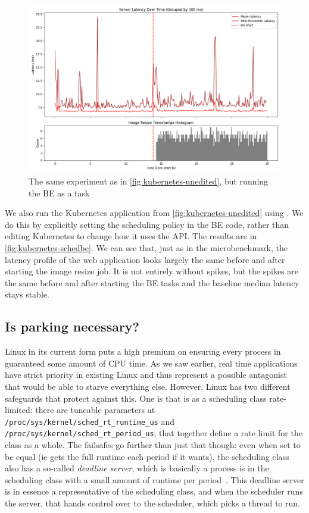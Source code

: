 \begin{figure}[t]
    \centering
    \includegraphics[width=\columnwidth]{graphs/kubernetes-schedbe.png}
    \caption{The same experiment as in \autoref{fig:kubernetes-unedited}, but
    running the BE as a \schedbe{} task}\label{fig:kubernetes-schedbe}
\end{figure}

We also run the Kubernetes application from \autoref{fig:kubernetes-unedited}
using \schedbe{}. We do this by explicitly setting the scheduling policy in the
BE code, rather than editing Kubernetes to change how it uses the \cgroups{}
API. The results are in \autoref{fig:kubernetes-schedbe}. We can see that, just
as in the microbenchmark, the latency profile of the web application looks
largely the same before and after starting the image resize job. It is not
entirely without spikes, but the spikes are the same before and after starting
the BE tasks and the baseline median latency stays stable. 

\subsection{Is parking necessary?}\label{ss:eval:parking}

Linux in its current form puts a high premium on ensuring every process in
guaranteed some amount of CPU time. As we saw earlier, real time applications
have strict priority in existing Linux and thus represent a possible antagonist
that would be able to starve everything else. However, Linux has two different
safeguards that protect against this. One is that \fifoclass{} is as a
scheduling class rate-limited: there are tuneable parameters at
\texttt{/proc/sys/kernel/sched\_rt\_runtime\_us} and
\texttt{/proc/sys/kernel/sched\_rt\_period\_us}, that together define a rate
limit for the \fifoclass{} class as a whole. The failsafes go further than just
that though: even when set to be equal (ie \fifoclass{} gets the full runtime
each period if it wants), the \normalclass{} scheduling class also has a
so-called \textit{deadline server}, which is basically a process is in the
\deadlineclass{} scheduling class with a small amount of runtime per
period~\cite{lkml-deadline-srv}. This deadline server is in essence a
representative of the \normalclass{} scheduling class, and when the
\deadlineclass{} scheduler runs the server, that hands control over to the
\normalclass{} scheduler, which picks a thread to run.


